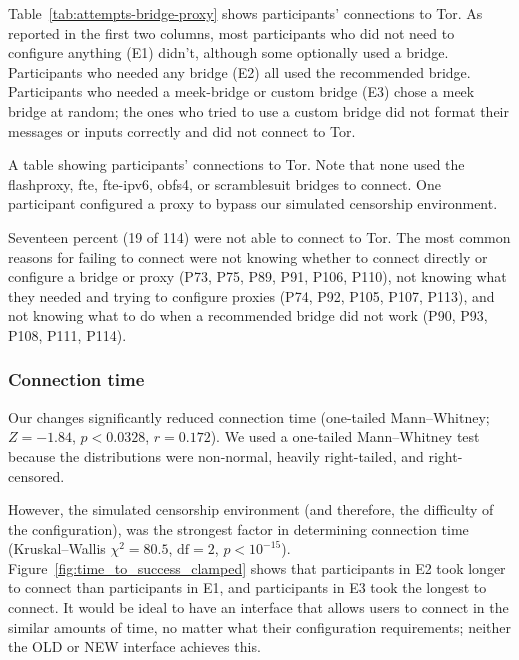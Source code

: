 \documentclass[USenglish,oneside,twocolumn]{article}
\begin{document}
Table~\ref{tab:attempts-bridge-proxy} shows participants' connections to Tor. As reported in the first two columns, most participants who did not need to configure anything (E1) didn't, although some optionally used a bridge. Participants who needed any bridge (E2) all used the recommended bridge. Participants who needed a meek-bridge or custom bridge (E3) chose a meek bridge at random; the ones who tried to use a custom bridge did not format their messages or inputs correctly and did not connect to Tor. 

\begin{table}[t]
\centering

\caption{
A table showing participants' connections to Tor.
Note that none used the flashproxy, fte, fte-ipv6, obfs4, or scramblesuit bridges to connect. 
One participant configured a proxy to bypass our simulated censorship environment.
}
\label{tab:attempts-bridge-proxy}
\end{table} 

Seventeen percent (19 of 114) were not able to connect to Tor. The most common reasons for failing to connect were not knowing whether to connect directly or configure a bridge or proxy (P73, P75, P89, P91, P106, P110), not knowing what they needed and trying to configure proxies (P74, P92, P105, P107, P113), and not knowing what to do when a recommended bridge did not work (P90, P93, P108, P111, P114). 



\subsubsection{Connection time} 
Our changes significantly reduced connection time (one-tailed Mann--Whitney; $ Z = -1.84$, $p < 0.0328$, $r= 0.172$). We used a one-tailed Mann--Whitney test because the distributions were non-normal, heavily right-tailed, and right-censored. 

However, the simulated censorship environment (and therefore, the difficulty of the configuration), was the strongest factor in determining connection time (Kruskal--Wallis $\chi^2 = 80.5$, $\mbox{df} = 2$, $p < 10^{-15}$). Figure~\ref{fig:time_to_success_clamped} shows that participants in E2 took longer to connect than participants in E1, and participants in E3 took the longest to connect. It would be ideal to have an interface that allows users to connect in the similar amounts of time, no matter what their configuration requirements; neither the OLD or NEW interface achieves this. 
\end{document}
